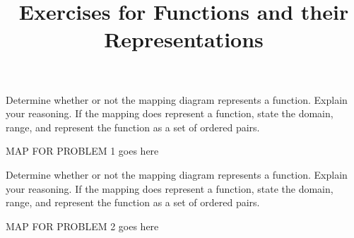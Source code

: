 \documentclass{ximera}
\title{Exercises for Functions and their Representations}
\begin{document}
\begin{abstract}
\end{abstract}
\maketitle





\begin{problem}\label{mappingfirst}
Determine whether or not the mapping diagram represents a function. Explain your reasoning. If the mapping does represent a function, state the domain, range, and represent the function as a set of ordered pairs.

MAP FOR PROBLEM 1 goes here
\end{problem} 






\begin{problem}\label{mappinglast}
Determine whether or not the mapping diagram represents a function. Explain your reasoning. If the mapping does represent a function, state the domain, range, and represent the function as a set of ordered pairs.

    MAP FOR PROBLEM 2 goes here
\end{problem} 



\end{document}
